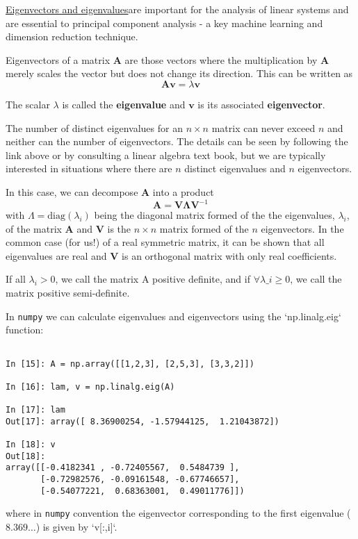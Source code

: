 \documentclass[a4paper,10pt]{article}
\newcommand{\link}[2]{{\color{blue}\href{#1}{#2}}}
\begin{document}
\link{https://en.wikipedia.org/wiki/Eigenvalues_and_eigenvectors}{Eigenvectors and eigenvalues}are important for the analysis of linear systems and are essential to principal component analysis - a key machine learning and dimension reduction technique.

Eigenvectors of a matrix $\mathbf{A}$ are those vectors where the multiplication by $\mathbf{A}$ merely scales the vector but does not change its direction. This can be written as
$$\mathbf{A}\mathbf{v} = \lambda \mathbf{v}$$

The scalar $\lambda$ is called the \textbf{eigenvalue} and $\mathbf{v}$ is its associated \textbf{eigenvector}.

The number of distinct eigenvalues for an $n\times n$ matrix can never exceed $n$ and neither can the number of eigenvectors. The details can be seen by following the link above or by consulting a linear algebra text book, but we are typically interested in situations where there are $n$ distinct eigenvalues and $n$ eigenvectors.

In this case, we can decompose $\mathbf{A}$ into a product
$$\mathbf{A} = \mathbf{V} \bm{\Lambda} \mathbf{V}^{-1}$$ with $\Lambda=\mathrm{diag}(\lambda_i)$ being the diagonal matrix formed of the the eigenvalues, $\lambda_i$, of the matrix $\mathbf{A}$ and $\mathbf{V}$ is the $n\times n$ matrix formed of the $n$ eigenvectors. In the common case (for us!) of a real symmetric matrix, it can be shown that all eigenvalues are real and  $\mathbf{V}$ is an orthogonal matrix with only real coefficients.

If all $\lambda_i >0$, we call the matrix $\mathrm{A}$ positive definite, and if $\forall \lambda\_i \ge 0$, we call the matrix positive semi-definite. 


In \texttt{numpy} we can calculate eigenvalues and eigenvectors using the `np.linalg.eig` function:
\begin{lstlisting}

In [15]: A = np.array([[1,2,3], [2,5,3], [3,3,2]])

In [16]: lam, v = np.linalg.eig(A)

In [17]: lam
Out[17]: array([ 8.36900254, -1.57944125,  1.21043872])

In [18]: v
Out[18]: 
array([[-0.4182341 , -0.72405567,  0.5484739 ],
       [-0.72982576, -0.09161548, -0.67746657],
       [-0.54077221,  0.68363001,  0.49011776]])
\end{lstlisting}


where in \texttt{numpy} convention the eigenvector corresponding to the first eigenvalue ($8.369\ldots$) is given by `v[:,i]`.
\end{document}
